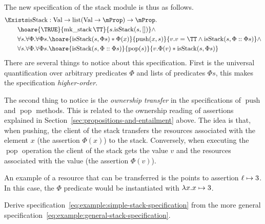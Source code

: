 The new specification of the stack module is thus as follows.
\begin{align}
  \label{eq:example:general-stack-specification}
  \begin{split}
    &\Exists \mathrm{isStack} : \Val \to \mathrm{list} (\Val \to \Prop) \to \Prop.\\
    &\qquad \hoare{\TRUE}{\operatorname{mk\_stack} \TT}{s. \mathrm{isStack}(s,[])} \land \\
    &\qquad \forall s. \forall \Phi . \forall \Phi{s}. \hoare{\mathrm{isStack}(s,\Phi{s}) * \Phi(x)}{\operatorname{push} (x,s)}{v. v = \TT \land \mathrm{isStack}(s,\Phi :: \Phi{s})} \land\\
    &\qquad \forall s. \forall \Phi . \forall \Phi{s}. \hoare{\mathrm{isStack}(s,\Phi :: \Phi{s})}{\operatorname{pop} (s)}{v. \Phi(v) \ast \mathrm{isStack}(s,\Phi{s})}
  \end{split}
\end{align}
There are several things to notice about this specification.
First is the universal quantification over arbitrary predicates $\Phi$ and lists of predicates $\Phi{s}$, this makes the specification \emph{higher-order}.

The second thing to notice is the \emph{ownership transfer} in the specifications of $\operatorname{push}$ and $\operatorname{pop}$ methods.
This is related to the ownership reading of assertions explained in Section~\ref{sec:propositions-and-entailment} above.
The idea is that, when pushing, the client of the stack transfers the resources associated with the element $x$ (the assertion $\Phi(x)$) to the stack.
Conversely, when executing the $\operatorname{pop}$ operation the client of the stack gets the value $v$ and the resources associated with the value (the assertion $\Phi(v)$).

An example of a resource that can be transferred 
is the points to assertion $\ell \mapsto 3$. In this case, the
$\Phi$ predicate would be instantiated with $\lambda x.x \mapsto 3$.
\begin{exercise}
  Derive specification~\eqref{eq:example:simple-stack-specification} from the more general specification~\eqref{eq:example:general-stack-specification}.
\end{exercise}


